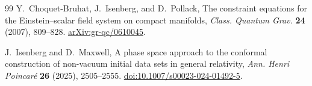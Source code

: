 \documentclass[11pt]{article}
\numberwithin{equation}{section}
\theoremstyle{definition}
\theoremstyle{remark}
\begin{document}
\begin{thebibliography}{99}
Y.~Choquet-Bruhat, J.~Isenberg, and D.~Pollack,
The constraint equations for the Einstein--scalar field system on compact manifolds,
\emph{Class. Quantum Grav.} \textbf{24} (2007), 809--828.
\href{https://arxiv.org/abs/gr-qc/0610045}{arXiv:gr-qc/0610045}.

J.~Isenberg and D.~Maxwell,
A phase space approach to the conformal construction of non-vacuum initial data sets in general relativity,
\emph{Ann. Henri Poincar\'e} \textbf{26} (2025), 2505--2555.
\href{https://doi.org/10.1007/s00023-024-01492-5}{doi:10.1007/s00023-024-01492-5}.
\end{thebibliography}
\end{document}
